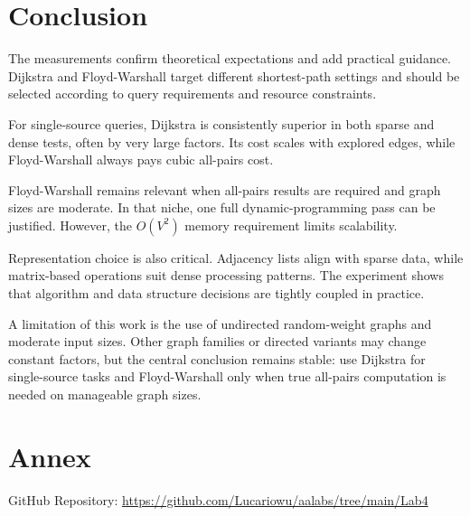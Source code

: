 \documentclass{labreport}
\begin{document}
\section{Conclusion}

The measurements confirm theoretical expectations and add practical guidance. Dijkstra and Floyd-Warshall target different shortest-path settings and should be selected according to query requirements and resource constraints.

For single-source queries, Dijkstra is consistently superior in both sparse and dense tests, often by very large factors. Its cost scales with explored edges, while Floyd-Warshall always pays cubic all-pairs cost.

Floyd-Warshall remains relevant when all-pairs results are required and graph sizes are moderate. In that niche, one full dynamic-programming pass can be justified. However, the $O(V^2)$ memory requirement limits scalability.

Representation choice is also critical. Adjacency lists align with sparse data, while matrix-based operations suit dense processing patterns. The experiment shows that algorithm and data structure decisions are tightly coupled in practice.

A limitation of this work is the use of undirected random-weight graphs and moderate input sizes. Other graph families or directed variants may change constant factors, but the central conclusion remains stable: use Dijkstra for single-source tasks and Floyd-Warshall only when true all-pairs computation is needed on manageable graph sizes.

\newpage

\section{Annex}

GitHub Repository: \url{https://github.com/Lucariowu/aalabs/tree/main/Lab4}
\end{document}
